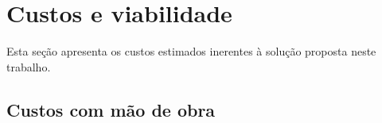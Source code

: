 \chapter{Custos e viabilidade}

  Esta seção apresenta os custos estimados inerentes à solução proposta neste trabalho.
  
   \section{Custos com mão de obra}
   
      